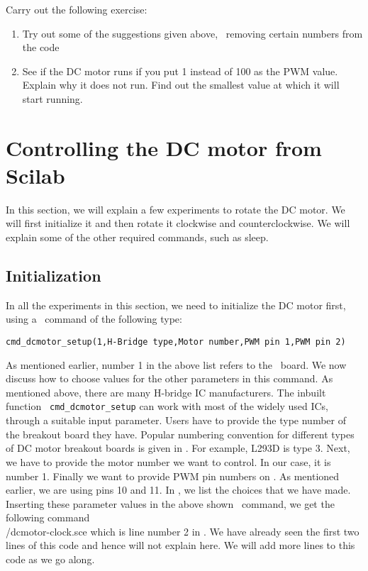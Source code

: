 \begin{exercise}
Carry out the following exercise:
\begin{enumerate}
\item Try out some of the suggestions given above, \ie\ removing
  certain numbers from the code
\item See if the DC motor runs if you put 1 instead of 100 as the PWM
  value.  Explain why it does not run.  Find out the smallest value at
  which it will start running.
\end{enumerate}
\end{exercise}




\section{Controlling the DC motor from Scilab}
\label{sec:dcm-sci}
In this section, we will explain a few experiments to rotate the DC
motor.  We will first initialize it and then rotate it clockwise and
counterclockwise.  We will explain some of the other required
commands, such as sleep.

\subsection{Initialization}
In all the experiments in this section, we need to initialize the DC
motor first, using a \scilab\ command of the following type:

\begin{lstlisting}[style=nonumbers]
  cmd_dcmotor_setup(1,H-Bridge type,Motor number,PWM pin 1,PWM pin 2)
\end{lstlisting}
As mentioned earlier, number 1 in the above list refers to the
\arduino\ board.  We now discuss how to choose values for the other
parameters in this command.  As mentioned above, there are many
H-bridge IC manufacturers.  The inbuilt function {\tt
  cmd\_dcmotor\_setup} can work with most of the widely used ICs,
through a suitable input parameter.  Users have to provide the type
number of the breakout board they have.  Popular numbering convention
for different types of DC motor breakout boards is given in
.  For example, L293D is type 3.  Next, we
have to provide the motor number we want to control.  In our case, it
is number 1.  Finally we want to provide PWM pin numbers on \arduino.
As mentioned earlier, we are using pins 10 and 11.  In
, we list the choices that we have made.
Inserting these parameter values in the above shown \scilab\ command,
we get the following command \\

{\LocDCMscicode/dcmotor-clock.sce}
which is line number 2 in .  We have already
seen 
the first two lines of this code and hence will not explain here.  We
will add more lines to this code as we go along.

